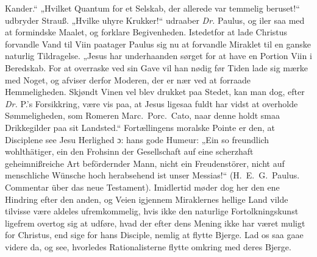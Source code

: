 \documentclass[12pt,a4paper]{book}
\begin{document}
Kander.“ „Hvilket Quantum for et Selskab, der allerede
var temmelig beruset!“ udbryder Strauß. „Hvilke uhyre Krukker!“ udraaber \textit{Dr.}
Paulus, og iler saa med at formindske Maalet, og forklare Begivenheden. Istedetfor at lade
Christus forvandle Vand til Viin paatager Paulus sig nu at forvandle Miraklet til en ganske
naturlig Tildragelse. „Jesus har underhaanden sørget for at have en Portion Viin i
Beredskab. For at overraske ved sin Gave vil han nødig før Tiden lade sig mærke med Noget,
og afviser derfor Moderen, der er nær ved at forraade Hemmeligheden. Skjøndt Vinen vel blev
drukket paa Stedet, kan man dog, efter \textit{Dr.} P.'s Forsikkring, være vis paa, at Jesus
ligesaa fuldt har vidst at overholde Sømmeligheden, som Romeren Marc.\ Porc.\ Cato, naar
denne holdt smaa Drikkegilder paa sit Landsted.“ Fortællingens moralske Pointe er den, at
Disciplene see Jesu Herlighed ɔ: hans gode Humeur: „Ein so freundlich wohlthätiger, ein den
Frohsinn der Gesellschaft auf eine scherzhaft geheimnißreiche Art befördernder Mann, nicht
ein Freudenstörer, nicht auf menschliche Wünsche hoch herabsehend ist unser Messias!“
(H.\ E.\ G.\ Paulus. Commentar über das neue Testament). Imidlertid møder dog her den ene Hindring
efter den anden, og Veien igjennem Miraklernes hellige Land vilde tilvisse være aldeles
ufremkommelig, hvis ikke den naturlige Fortolkningskunst ligefrem overtog sig at udføre, hvad
der efter dens Mening ikke har været muligt for Christus, end sige for hans Disciple, nemlig
at flytte Bjerge. Lad os saa gaae videre da, og see, hvorledes Rationalisterne flytte omkring
med deres Bjerge.
\end{document}
